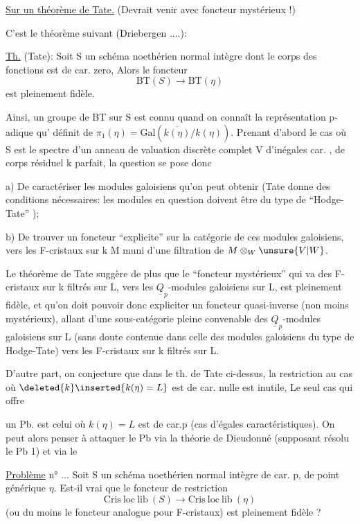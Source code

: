 \uline{Sur un théorème de Tate.} (Devrait venir avec foncteur mystérieux !)

C'est le théorème suivant (Driebergen ....):

\uline{Th.} (Tate): Soit S un schéma noethérien normal intègre dont le corps des fonctions  est de car. zero, Alors le foncteur
\[
\mathrm{BT}(S)\longrightarrow\mathrm{BT}(\eta)
\]
est pleinement fidèle.

Ainsi, un groupe de BT sur S est connu  quand on connaît la représentation p-adique qu' définit de $\pi_1(\eta)=\mathrm{Gal}(\overline{k(\eta)}/k(\eta))$. Prenant d'abord le cas où S est le spectre d'un anneau de valuation discrète complet V d'inégales car. , de corps  résiduel k parfait, la question se pose donc

a) De caractériser les modules galoisiens qu'on peut obtenir (Tate donne des conditions nécessaires: les modules en question doivent être du type de ``Hodge-Tate'' );

b) De trouver un foncteur ``explicite'' sur la catégorie de ces modules galoisiens, vers les F-cristaux sur k M muni d'une filtration de $M\otimes_W\unsure{V|W}$.

Le théorème de Tate suggère de plus que le ``foncteur mystérieux'' qui va des F-cristaux sur k filtrés sur L, vers les $\underline{Q}_p$-modules galoisiens sur L, est pleinement fidèle, et qu'on doit pouvoir donc  expliciter un foncteur quasi-inverse (non moins mystérieux), allant d'une sous-catégorie pleine convenable des $\underline{Q}_p$-modules galoisiens sur L (sans doute contenue dans celle des modules galoisiens du type de Hodge-Tate) vers les F-cristaux sur k filtrés sur L.

D'autre part, on conjecture que dans le th. de Tate ci-dessus, la restriction au cas où $\deleted{k}\inserted{k(\eta)=L}$ est de car. nulle est inutile, Le seul cas qui offre

un Pb. est celui où $k(\eta)=L$ est de car.p (cas d'égales caractéristiques). On peut alors penser à attaquer le Pb via la théorie de Dieudonné (supposant résolu le Pb 1) et via le

\uline{Problème} n° ... Soit S un schéma noethérien normal  intègre de car. p, de point générique $\eta$. Est-il vrai que le foncteur de restriction
\[
\mathrm{Cris\ loc\ lib}\ (S)\longrightarrow\mathrm{Cris\ loc\ lib}\ (\eta)
\]
(ou du moins le foncteur analogue pour F-cristaux) est pleinement fidèle ?

